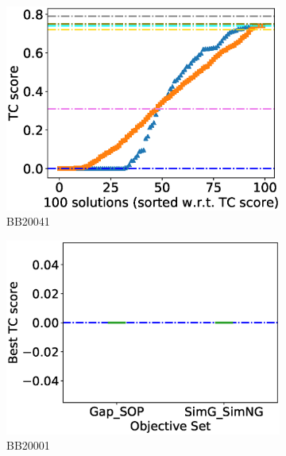 \begin{figure}[!htbp]
\begin{adjustwidth}{-1cm}{-1cm}
\begin{subfigure}{0.22\textwidth}
			\includegraphics[width=\columnwidth]{Figure/summary/precomputedInit/Balibase/BB20041_tc_density_single_run_2}
			\caption{BB20041}
		\end{subfigure}
		\begin{subfigure}{0.22\textwidth}
			\includegraphics[width=\columnwidth]{Figure/summary/precomputedInit/Balibase/BB20001_objset_tc_rank_2}
			\caption{BB20001}
		\end{subfigure}	
		\begin{subfigure}{0.22\textwidth}

\end{subfigure}
\end{adjustwidth}
\end{figure}
